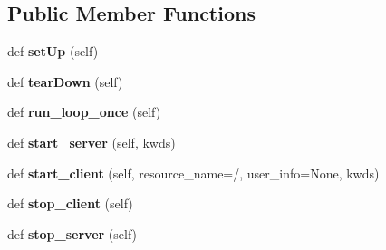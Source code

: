 \subsection*{Public Member Functions}
\begin{DoxyCompactItemize}
\item 
\mbox{\label{classwebsockets_1_1test__client__server_1_1_client_server_tests_aac16563e417c6b2cdb62d687bbef4f2f}} 
def {\bfseries set\+Up} (self)
\item 
\mbox{\label{classwebsockets_1_1test__client__server_1_1_client_server_tests_aaa70917c1bf847913bc7108fc4b38045}} 
def {\bfseries tear\+Down} (self)
\item 
\mbox{\label{classwebsockets_1_1test__client__server_1_1_client_server_tests_af9c4715f83b6aa3bf73445332deaecbe}} 
def {\bfseries run\+\_\+loop\+\_\+once} (self)
\item 
\mbox{\label{classwebsockets_1_1test__client__server_1_1_client_server_tests_a5b1ebbff41470f37e9a7a3a35026b8b4}} 
def {\bfseries start\+\_\+server} (self, kwds)
\item 
\mbox{\label{classwebsockets_1_1test__client__server_1_1_client_server_tests_a410196cc6e4c43a5314feebffa6103c6}} 
def {\bfseries start\+\_\+client} (self, resource\+\_\+name=\textquotesingle{}/\textquotesingle{}, user\+\_\+info=None, kwds)
\item 
\mbox{\label{classwebsockets_1_1test__client__server_1_1_client_server_tests_a8a5b46b400f286c652552ebc30d1c056}} 
def {\bfseries stop\+\_\+client} (self)
\item 
\mbox{\label{classwebsockets_1_1test__client__server_1_1_client_server_tests_ada15ff1166aad99c5f5f5a8008f740b4}} 
def {\bfseries stop\+\_\+server} (self)
\item 
\mbox{\label{classwebsockets_1_1test__client__server_1_1_client_server_tests_a10ae3088539fee04651529591a5fd804}} 

\end{DoxyCompactItemize}
